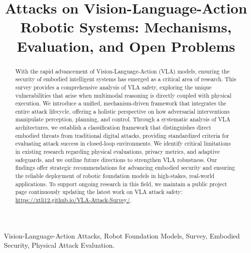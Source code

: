 \documentclass[journal]{IEEEtran}
\begin{document}
\title{Attacks on Vision-Language-Action Robotic Systems: Mechanisms, Evaluation, and Open Problems}




\maketitle

\begin{abstract}
With the rapid advancement of Vision-Language-Action (VLA) models, ensuring the security of embodied intelligent systems has emerged as a critical area of research. This survey provides a comprehensive analysis of VLA safety, exploring the unique vulnerabilities that arise when multimodal reasoning is directly coupled with physical execution. We introduce a unified, mechanism-driven framework that integrates the entire attack lifecycle, offering a holistic perspective on how adversarial interventions manipulate perception, planning, and control. Through a systematic analysis of VLA architectures, we establish a classification framework that distinguishes direct embodied threats from traditional digital attacks, providing standardized criteria for evaluating attack success in closed-loop environments. We identify critical limitations in existing research regarding physical evaluations, privacy metrics, and adaptive safeguards, and we outline future directions to strengthen VLA robustness. Our findings offer strategic recommendations for advancing embodied security and ensuring the reliable deployment of robotic foundation models in high-stakes, real-world applications. To support ongoing research in this field, we maintain a public project page continuously updating the latest work on VLA attack safety: \url{https://xtli12.github.io/VLA-Attack-Survey/}.
\end{abstract}

\begin{IEEEkeywords}
Vision-Language-Action Attacks, Robot Foundation Models, Survey, Embodied Security, Physical Attack Evaluation.
\end{IEEEkeywords}









{
\scriptsize


}

\vfill
\end{document}
